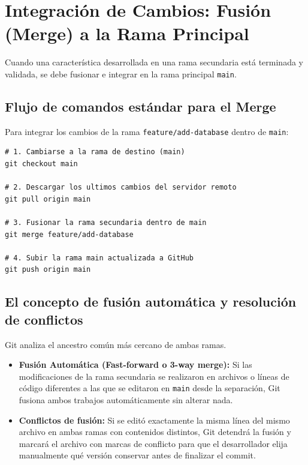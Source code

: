 \documentclass[
10pt, %
a4paper, %
oneside, %
headinclude,footinclude, %
BCOR5mm, %
]{scrartcl}
\begin{document}
\newpage
\section{Integración de Cambios: Fusión (Merge) a la Rama Principal}

Cuando una característica desarrollada en una rama secundaria está terminada y validada, se debe fusionar e integrar en la rama principal \texttt{main}.

\subsection{Flujo de comandos estándar para el Merge}
Para integrar los cambios de la rama \texttt{feature/add-database} dentro de \texttt{main}:

\begin{lstlisting}[language=DOS]
# 1. Cambiarse a la rama de destino (main)
git checkout main

# 2. Descargar los ultimos cambios del servidor remoto
git pull origin main

# 3. Fusionar la rama secundaria dentro de main
git merge feature/add-database

# 4. Subir la rama main actualizada a GitHub
git push origin main
\end{lstlisting}

\subsection{El concepto de fusión automática y resolución de conflictos}
Git analiza el ancestro común más cercano de ambas ramas. 

\begin{itemize}
	\item \textbf{Fusión Automática (Fast-forward o 3-way merge):} Si las modificaciones de la rama secundaria se realizaron en archivos o líneas de código diferentes a las que se editaron en \texttt{main} desde la separación, Git fusiona ambos trabajos automáticamente sin alterar nada.
	\item \textbf{Conflictos de fusión:} Si se editó exactamente la misma línea del mismo archivo en ambas ramas con contenidos distintos, Git detendrá la fusión y marcará el archivo con marcas de conflicto para que el desarrollador elija manualmente qué versión conservar antes de finalizar el commit.
\end{itemize}
\end{document}
